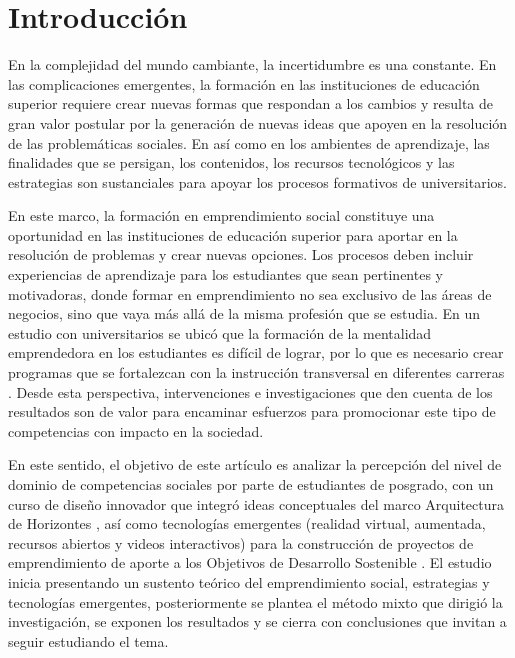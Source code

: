 \documentclass[spanish]{textolivre}
\begin{document}
\begin{polyabstract}
\begin{english}
\begin{abstract}
\end{abstract}
\end{english}
\end{polyabstract}

\section{Introducción}\label{sec-intro}
En la complejidad del mundo cambiante, la incertidumbre es una constante. En las complicaciones emergentes, la formación en las instituciones de educación superior requiere crear nuevas formas que respondan a los cambios y resulta de gran valor postular por la generación de nuevas ideas que apoyen en la resolución de las problemáticas sociales.  En así como en los ambientes de aprendizaje, las finalidades que se persigan, los contenidos, los recursos tecnológicos y las estrategias son sustanciales para apoyar los procesos formativos de universitarios. 

En este marco, la formación en emprendimiento social constituye una oportunidad en las instituciones de educación superior para aportar en la resolución de problemas y crear nuevas opciones. Los procesos deben incluir experiencias de aprendizaje para los estudiantes que sean pertinentes y motivadoras, donde formar en emprendimiento no sea exclusivo de las áreas de negocios, sino que vaya más allá de la misma profesión que se estudia. En un estudio con universitarios se ubicó que la formación de la mentalidad emprendedora en los estudiantes es difícil de lograr, por lo que es necesario crear programas que se fortalezcan con la instrucción transversal en diferentes carreras \cite{portuguez-castro2020}. Desde esta perspectiva, intervenciones e investigaciones que den cuenta de los resultados son de valor para encaminar esfuerzos para promocionar este tipo de competencias con impacto en la sociedad.

En este sentido, el objetivo de este artículo es analizar la percepción del nivel de dominio de  competencias sociales por parte de estudiantes de posgrado, con un curso de diseño innovador que integró ideas conceptuales del marco Arquitectura de Horizontes \cite{barroso2019}, así como tecnologías emergentes (realidad virtual, aumentada, recursos abiertos y videos interactivos) para la construcción de proyectos de emprendimiento de aporte a los Objetivos de Desarrollo Sostenible \cite{unesco2015}. El estudio inicia presentando un sustento teórico del emprendimiento social, estrategias y tecnologías emergentes, posteriormente se plantea el método mixto que dirigió la investigación, se exponen los resultados y se cierra con conclusiones que invitan a seguir estudiando el tema.
\end{document}
